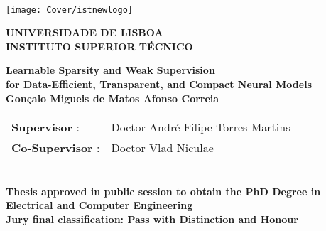 \setcounter{page}{1} 


\thispagestyle{empty}
\begin{flushleft} ~\\ \vspace{-12mm} \hspace{-12mm}  \texttt{[image: Cover/istnewlogo]}

    \centering
    \Large \textbf{UNIVERSIDADE DE LISBOA \\ INSTITUTO SUPERIOR TÉCNICO}
    \vspace{10mm}


    \centering
    \Large \textbf{Learnable Sparsity and Weak Supervision\\for Data-Efficient, Transparent, and Compact Neural Models}
    \\ \vspace{10mm}  %
    \Large \textbf{Gonçalo Migueis de Matos Afonso Correia} \\
    \vspace{10mm}

    \large %
    \begin{minipage}{\textwidth}
        \hspace{15mm}
        \begin{tabularx}{\textwidth}{ l @{ } l }
            \centering
            \textbf{Supervisor} :    & Doctor André Filipe Torres Martins \\
            \textbf{Co-Supervisor} : & Doctor Vlad Niculae                \\
        \end{tabularx}
    \end{minipage}
    \\ \vspace{10mm}
    \centering
    \large \textbf{Thesis approved in public session to obtain the PhD Degree in}\\
    \large \textbf{Electrical and Computer Engineering}\\
    \vspace{5mm}
    \large \textbf{Jury final classification:  Pass with Distinction and Honour}\\
    \vspace{12mm}


\end{flushleft}
